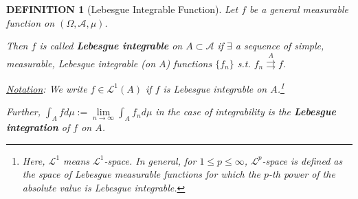 \documentclass[12pt]{article}
\theoremstyle{blueplain}
\theoremstyle{bluedef}
\newtheorem{definition}{DEFINITION}[section]
\theoremstyle{blueremark}
\numberwithin{equation}{section}
\begin{document}
\begin{definition}[Lebesgue Integrable Function]

  Let $f$ be a general measurable function on $(\Omega, \mathcal{A}, \mu)$.

  Then $f$ is called \textbf{Lebesgue integrable} on $A \subset \mathcal{A}$ if $\exists$ a sequence of simple, measurable, Lebesgue integrable (on $A$) functions $\{f_n\}$ s.t. $f_n \overset{A}{\rightrightarrows} f$.

  \underline{Notation}: We write $f \in \mathcal{L}^1(A)$ if $f$ is Lebesgue integrable on $A$.\footnote[1]{Here, $\mathcal{L}^1$ means $\mathcal{L}^1$-space. In general, for $1 \leq p \leq \infty$, $\mathcal{L}^p$-space is defined as the space of Lebesgue measurable functions for which the $p$-th power of the absolute value is Lebesgue integrable.}

  Further, $\int_A f d \mu := \lim\limits_{n \rightarrow \infty} \int_A f_n d \mu$ in the case of integrability is the \textbf{Lebesgue integration} of $f$ on $A$.
\end{definition}
\end{document}
